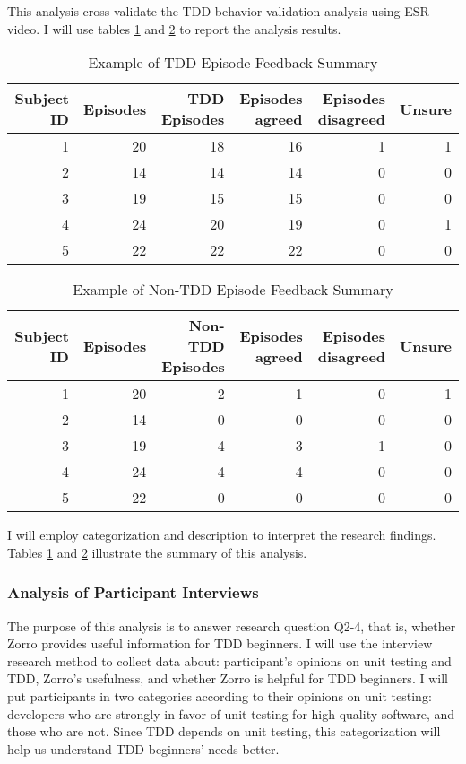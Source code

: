 This analysis cross-validate the TDD behavior validation analysis using
ESR video. I will use tables \ref{tab:TDDEpisodeFeedbackSum} and
\ref{tab:NonTDDEpisodeFeedbackSum} to report the analysis results.
\begin{table}[htbp]
\centering
  \caption{Example of TDD Episode Feedback Summary}\label{tab:TDDEpisodeFeedbackSum}  
  \begin{tabular}{|r|r||r|r|r|r|}
  \hline
    Subject ID & Episodes & TDD Episodes & Episodes agreed & Episodes disagreed & Unsure \\ \hline
    1 & 20 & 18 & 16 & 1 & 1 \\ \hline
    2 & 14 & 14 & 14 & 0 & 0 \\ \hline
    3 & 19 & 15 & 15 & 0 & 0 \\ \hline
    4 & 24 & 20 & 19 & 0 & 1 \\ \hline
    5 & 22 & 22 & 22 & 0 & 0 \\
  \hline
  \end{tabular}
\end{table}
\begin{table}[htbp]
\centering
  \caption{Example of Non-TDD Episode Feedback Summary}\label{tab:NonTDDEpisodeFeedbackSum}  
  \begin{tabular}{|r|r||r|r|r|r|}
  \hline
    Subject ID & Episodes & Non-TDD Episodes & Episodes agreed & Episodes disagreed & Unsure \\ \hline
    1 & 20 & 2 & 1 & 0 & 1 \\ \hline
    2 & 14 & 0 & 0 & 0 & 0 \\ \hline
    3 & 19 & 4 & 3 & 1 & 0 \\ \hline
    4 & 24 & 4 & 4 & 0 & 0 \\ \hline
    5 & 22 & 0 & 0 & 0 & 0 \\
  \hline
  \end{tabular}
\end{table}
I will employ categorization and description to interpret the research
findings. Tables \ref{tab:TDDEpisodeFeedbackSum} and
\ref{tab:NonTDDEpisodeFeedbackSum} illustrate the summary of this analysis.

\subsubsection{Analysis of Participant Interviews}
The purpose of this analysis is to answer research question Q2-4, that
is, whether Zorro provides useful information for TDD beginners. I
will use the interview research method to collect data about:
participant's opinions on unit testing and TDD, Zorro's usefulness,
and whether Zorro is helpful for TDD beginners. I will put
participants in two categories according to their opinions on unit
testing: developers who are strongly in favor of unit testing for high
quality software, and those who are not. Since TDD depends on unit
testing, this categorization will help us understand TDD beginners'
needs better.

